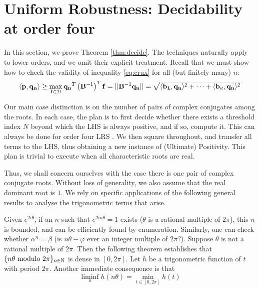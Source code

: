 \section{Uniform Robustness: Decidability at order four}
\label{section:decidability}
In this section, we prove Theorem \ref{thm:decide}. The techniques naturally apply to lower orders, and we omit their explicit treatment. Recall that we must show how to check the validity of inequality \ref{eq:crux} for all (but finitely many) $n$:
$$
\langle\mathbf{p}, \mathbf{q_n}\rangle \ge \max_{\mathbf{f} \in \mathcal{B}}\mathbf{q_n}^T\left(\mathbf{B}^{-1}\right)^T\mathbf{f} = ||\mathbf{B}^{-1}\mathbf{q_n}|| = \sqrt{\langle\mathbf{b_1}, \mathbf{q_n}\rangle^2 +\dots+\langle\mathbf{b_\kappa}, \mathbf{q_n}\rangle^2}
$$

Our main case distinction is on the number of pairs of complex conjugates among the roots. In each case, the plan is to first decide whether there exists a threshold index $N$ beyond which the LHS is always positive, and if so, compute it. This can always be done for order four LRS \cite{joeljames3}. We then square throughout, and transfer all terms to the LHS, thus obtaining a new instance of (Ultimate) Positivity. This plan is trivial to execute when all characteristic roots are real.



Thus, we shall concern ourselves with the case there is one pair of complex conjugate roots. Without loss of generality, we also assume that the real dominant root is $1$. We rely on specific applications of the following general results to analyse the trigonometric terms that arise.

  \label{thm:abelian}
 Given $e^{2i\theta}$, if an $n$ such that $e^{2i n \theta} = 1$ exists ($\theta$ is a rational multiple of $2\pi$), this $n$ is bounded, and can be efficiently found by enumeration. Similarly, one can check whether $\alpha^n = \beta$ (is $n\theta - \varphi$ ever an integer multiple of $2\pi$?). Suppose $\theta$ is not a rational multiple of $2\pi$. Then the following theorem establishes that $\{n\theta \text{ modulo } 2\pi\}_{n\in\mathbb{N}}$ is dense in $[0, 2\pi]$. Let $h$ be a trigonometric function of $t$ with period $2\pi$. Another immediate consequence is that
\begin{equation}
\label{eq:liminfmin}
\liminf_n h(n\theta)= \min_{t \in [0, 2\pi]} h(t)
\end{equation}
 
